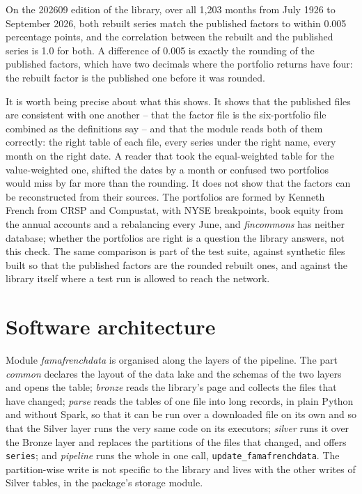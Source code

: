 On the 202609 edition of the library, over all 1{,}203 months from July 1926 to September 2026, both rebuilt series match the published factors to within 0.005 percentage points, and the correlation between the rebuilt and the published series is 1.0 for both. A difference of 0.005 is exactly the rounding of the published factors, which have two decimals where the portfolio returns have four: the rebuilt factor is the published one before it was rounded.

It is worth being precise about what this shows. It shows that the published files are consistent with one another -- that the factor file is the six-portfolio file combined as the definitions say -- and that the module reads both of them correctly: the right table of each file, every series under the right name, every month on the right date. A reader that took the equal-weighted table for the value-weighted one, shifted the dates by a month or confused two portfolios would miss by far more than the rounding. It does not show that the factors can be reconstructed from their sources. The portfolios are formed by Kenneth French from CRSP and Compustat, with NYSE breakpoints, book equity from the annual accounts and a rebalancing every June, and \emph{fincommons} has neither database; whether the portfolios are right is a question the library answers, not this check. The same comparison is part of the test suite, against synthetic files built so that the published factors are the rounded rebuilt ones, and against the library itself where a test run is allowed to reach the network.

\section{Software architecture}

Module \emph{famafrenchdata} is organised along the layers of the pipeline. The part \emph{common} declares the layout of the data lake and the schemas of the two layers and opens the table; \emph{bronze} reads the library's page and collects the files that have changed; \emph{parse} reads the tables of one file into long records, in plain Python and without Spark, so that it can be run over a downloaded file on its own and so that the Silver layer runs the very same code on its executors; \emph{silver} runs it over the Bronze layer and replaces the partitions of the files that changed, and offers \verb|series|; and \emph{pipeline} runs the whole in one call, \verb|update_famafrenchdata|. The partition-wise write is not specific to the library and lives with the other writes of Silver tables, in the package's storage module.


